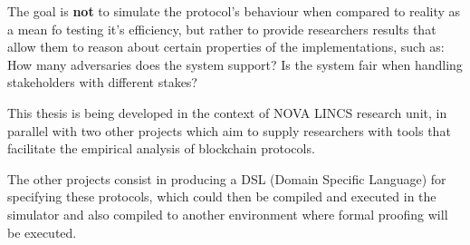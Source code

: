 The goal is \textbf{not} to simulate the protocol's behaviour when compared to reality as a mean fo testing it's efficiency, but rather to provide researchers results that allow them to reason about certain properties of the implementations, such as: How many adversaries does the system support? Is the system fair when handling stakeholders with different stakes?


This thesis is being developed in the context of NOVA LINCS research unit, in parallel with two other projects which aim to supply researchers with tools that facilitate the empirical analysis of blockchain protocols.

The other projects consist in producing a DSL (Domain Specific Language) for specifying these protocols, which could then be compiled and executed in the simulator and also compiled to another environment where formal proofing will be executed.

